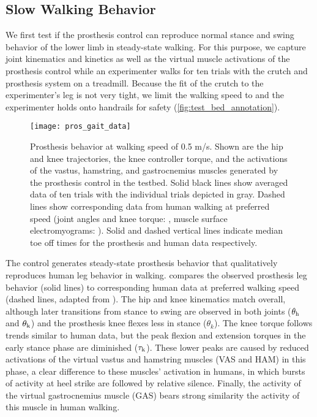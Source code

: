 \subsection{Slow Walking Behavior}\label{sec:completed_knee_exp_walk}
We first test if the prosthesis control can reproduce normal stance and swing
behavior of the lower limb in steady-state walking. For this purpose, we capture
joint kinematics and kinetics as well as the virtual muscle activations of the
prosthesis control while an experimenter walks for ten trials with the crutch
and prosthesis system on a treadmill. Because the fit of the crutch to the
experimenter's leg is not very tight, we limit the walking speed to
 and the experimenter holds onto handrails for safety
(\cref{fig:test_bed_annotation}).
\begin{figure}[t]
    \centering
    \texttt{[image: pros\_gait\_data]}
    \caption{Prosthesis behavior at walking speed of 0.5 m/s. Shown are the hip
    and knee trajectories, the knee controller torque, and the activations of
    the vastus, hamstring, and gastrocnemius muscles generated by the
    prosthesis control in the testbed. Solid black lines show averaged data  of
    ten trials with the individual trials depicted in gray. Dashed lines show
    corresponding data from human walking at preferred speed (joint angles and
    knee torque: \citet{winter2009biomechanics}, muscle surface
    electromyograms: \citet{perry2010gait}). Solid and dashed vertical lines
    indicate median toe off times for the prosthesis and human data
    respectively.
    }\label{fig:pros_gait_data}
\end{figure}

The control generates steady-state prosthesis behavior that qualitatively
reproduces human leg behavior in walking.  compares the
observed prosthesis leg behavior (solid lines) to corresponding human data at
preferred walking speed (dashed lines, adapted from
\citet{winter2009biomechanics,perry2010gait}). The hip and knee kinematics match
overall, although later transitions from stance to swing are observed in both
joints ($\theta_{\mathrm{h}}$ and $\theta_{\mathrm{k}}$) and the prosthesis knee flexes less
in stance ($\theta_k$). The knee torque follows trends similar to human data,
but the peak flexion and extension torques in the early stance phase are
diminished ($\tau_{\mathrm{k}}$). These lower peaks are caused by reduced activations
of the virtual vastus and hamstring muscles (VAS and HAM) in this phase, a clear
difference to these muscles' activation in humans, in which bursts of activity
at heel strike are followed by relative silence. Finally, the activity of the
virtual gastrocnemius muscle (GAS) bears strong similarity the activity of this
muscle in human walking.

